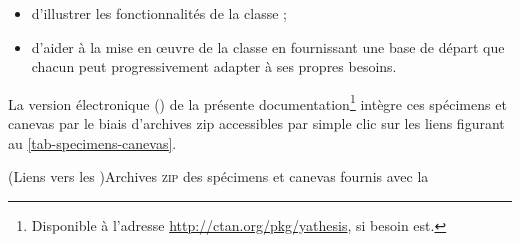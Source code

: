\begin{itemize}
\item d'illustrer les fonctionnalités de la classe ;
\item d'aider à la mise en œuvre de la classe en fournissant une base de départ
  que chacun peut progressivement adapter à ses propres
  besoins.%
\end{itemize}

La version électronique (\pdf{}) de la présente
documentation\footnote{Disponible à l'adresse
  \url{http://ctan.org/pkg/yathesis}, si besoin est.} intègre ces spécimens et
canevas par le biais d'archives \gls{zip} %
accessibles par simple clic sur les liens figurant au
\vref{tab-specimens-canevas}.

%   


  \begin{table}[ht]
    \centering
    \caption[Archives \textsc{zip} des spécimens et canevas fournis]{(Liens vers
      les )Archives \textsc{zip} des spécimens et canevas fournis avec la
      \yatcl{}}
    \label{tab-specimens-canevas}
    
  \end{table}

